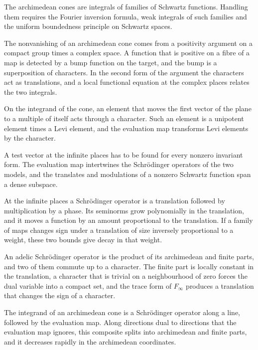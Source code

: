 The archimedean cones are integrals of families of Schwartz functions. Handling
them requires the Fourier inversion formula, weak integrals of such families
and the uniform boundedness principle on Schwartz spaces.

The nonvanishing of an archimedean cone comes from a positivity argument on a
compact group times a complex space. A function that is positive on a fibre of
a map is detected by a bump function on the target, and the bump is a
superposition of characters. In the second form of the argument the characters
act as translations, and a local functional equation at the complex places
relates the two integrals.

On the integrand of the cone, an element that moves the first vector of the
plane to a multiple of itself acts through a character. Such an element is a
unipotent element times a Levi element, and the evaluation map transforms Levi
elements by the character.

A test vector at the infinite places has to be found for every nonzero
invariant form. The evaluation map intertwines the Schrödinger operators of the
two models, and the translates and modulations of a nonzero Schwartz function
span a dense subspace.

At the infinite places a Schrödinger operator is a translation followed by
multiplication by a phase. Its seminorms grow polynomially in the translation,
and it moves a function by an amount proportional to the translation. If a
family of maps changes sign under a translation of size inversely proportional
to a weight, these two bounds give decay in that weight.

An adelic Schrödinger operator is the product of its archimedean and finite
parts, and two of them commute up to a character. The finite part is locally
constant in the translation, a character that is trivial on a neighbourhood of
zero forces the dual variable into a compact set, and the trace form of
$F_\infty$ produces a translation that changes the sign of a character.

The integrand of an archimedean cone is a Schrödinger operator along a line,
followed by the evaluation map. Along directions dual to directions that the
evaluation map ignores, this composite splits into archimedean and finite
parts, and it decreases rapidly in the archimedean coordinates.

